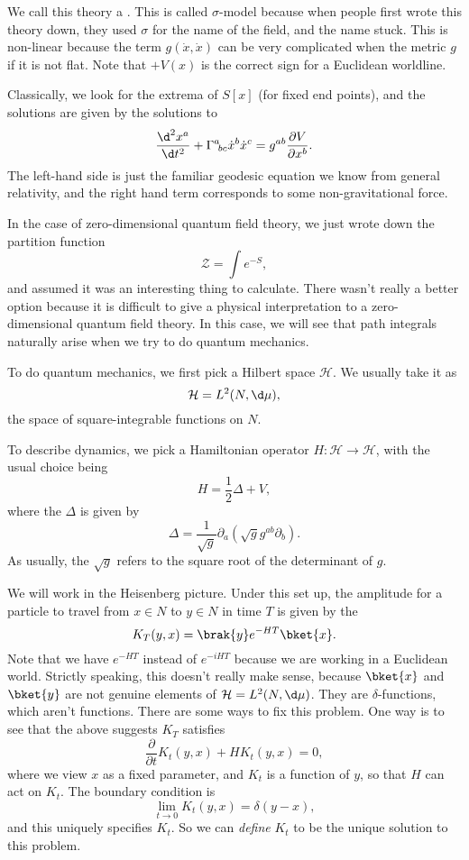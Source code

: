 \documentclass[a4paper]{article}
\begin{document}
We call this theory a . This is called $\sigma$-model because when people first wrote this theory down, they used $\sigma$ for the name of the field, and the name stuck. This is non-linear because the term $g(\dot{x}, \dot{x})$ can be very complicated when the metric $g$ if it is not flat. Note that $+V(x)$ is the correct sign for a Euclidean worldline.

Classically, we look for the extrema of $S[x]$ (for fixed end points), and the solutions are given by the solutions to
\[
  \frac{\d^2 x^a}{\d t^2} + \Gamma^a\!_{bc} \dot{x}^b \dot{x}^c = g^{ab} \frac{\partial V}{\partial x^b}.
\]
The left-hand side is just the familiar geodesic equation we know from general relativity, and the right hand term corresponds to some non-gravitational force.

In the case of zero-dimensional quantum field theory, we just wrote down the partition function
\[
  \mathcal{Z} = \int e^{-S},
\]
and assumed it was an interesting thing to calculate. There wasn't really a better option because it is difficult to give a physical interpretation to a zero-dimensional quantum field theory. In this case, we will see that path integrals naturally arise when we try to do quantum mechanics.

To do quantum mechanics, we first pick a Hilbert space $\mathcal{H}$. We usually take it as
\[
  \mathcal{H} = L^2(N, \d \mu),
\]
the space of square-integrable functions on $N$.

To describe dynamics, we pick a Hamiltonian operator $H: \mathcal{H} \to \mathcal{H}$, with the usual choice being
\[
  H = \frac{1}{2} \Delta + V,
\]
where the  $\Delta$\index{$\Delta$} is given by
\[
  \Delta = \frac{1}{\sqrt{g}} \partial_a(\sqrt{g} g^{ab} \partial_b).
\]
As usually, the $\sqrt{g}$ refers to the square root of the determinant of $g$.

We will work in the Heisenberg picture. Under this set up, the amplitude for a particle to travel from $x \in N$ to $y \in N$ in time $T$ is given by the 
\[
  K_T(y, x) = \brak{y} e^{-HT}\bket{x}.
\]
Note that we have $e^{-HT}$ instead of $e^{-iHT}$ because we are working in a Euclidean world. Strictly speaking, this doesn't really make sense, because $\bket{x}$ and $\bket{y}$ are not genuine elements of $\mathcal{H} = L^2(N, \d \mu)$. They are $\delta$-functions, which aren't functions. There are some ways to fix this problem. One way is to see that the above suggests $K_T$ satisfies
\[
  \frac{\partial}{\partial t} K_t(y, x) + H K_t(y, x) = 0,
\]
where we view $x$ as a fixed parameter, and $K_t$ is a function of $y$, so that $H$ can act on $K_t$. The boundary condition is
\[
  \lim_{t \to 0} K_t(y, x) = \delta (y - x),
\]
and this uniquely specifies $K_t$. So we can \emph{define} $K_t$ to be the unique solution to this problem.
\end{document}
